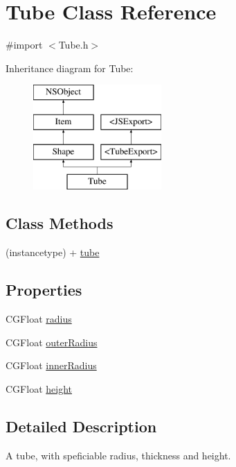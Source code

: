 \hypertarget{interface_tube}{}\section{Tube Class Reference}
\label{interface_tube}


{\ttfamily \#import $<$Tube.\+h$>$}

Inheritance diagram for Tube\+:\begin{figure}[H]
\begin{center}
\leavevmode
\includegraphics[height=4.000000cm]{interface_tube}
\end{center}
\end{figure}
\subsection*{Class Methods}
\begin{DoxyCompactItemize}
\item 
(instancetype) + \hyperlink{interface_tube_aa8b6c6af29c841cc0517225b97a7762f}{tube}
\end{DoxyCompactItemize}
\subsection*{Properties}
\begin{DoxyCompactItemize}
\item 
C\+G\+Float \hyperlink{interface_tube_a5ca82b412fe7dd377e2cb37bc433f21e}{radius}
\item 
C\+G\+Float \hyperlink{interface_tube_a2ddbbdc8d3950c2f7ae89cc6ce8a0519}{outer\+Radius}
\item 
C\+G\+Float \hyperlink{interface_tube_a9025a2747909c0916c0a93fdab6165ee}{inner\+Radius}
\item 
C\+G\+Float \hyperlink{interface_tube_a8b95b8561bc53d43a21187a0a1099309}{height}
\end{DoxyCompactItemize}


\subsection{Detailed Description}
A tube, with speficiable radius, thickness and height. 

